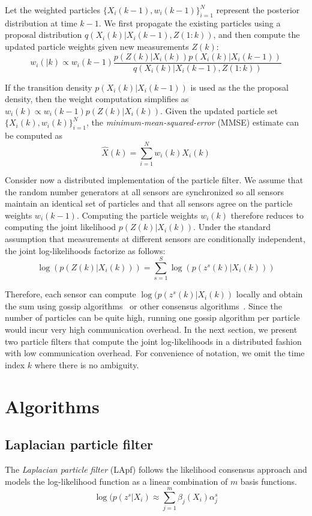 \documentclass[10pt,letterpaper,final]{article}
\begin{document}
Let the weighted particles $\{X_i(k-1),w_i(k-1) \}_{i=1}^N$ represent the posterior distribution at time $k-1$. We first propagate the existing particles using a proposal distribution $q(X_i(k)|X_i(k-1), Z(1:k))$, and then compute the updated particle weights given new measurements $Z(k)$:
\begin{equation}
w_i(|k) \propto w_i(k-1)\frac{p(Z(k)|X_i(k))p(X_i(k)|X_i(k-1))}{q(X_i(k)|X_i(k-1), Z(1:k))}
\end{equation}

If the transition density $p(X_i(k)|X_i(k-1))$ is used as the the proposal density, then the weight computation simplifies as $w_i(k) \propto w_i(k-1)p(Z(k)|X_i(k))$. Given the updated particle set $\{ X_i(k), w_i(k)\}_{i=1}^N$, the \textit{minimum-mean-squared-error} (MMSE) estimate can be computed as
\begin{equation}
\hat{X}(k) = \sum_{i=1}^N w_i(k)X_i(k)
\end{equation}

Consider now a distributed implementation of the particle filter. We assume that the random number generators at all sensors are synchronized so all sensors maintain an identical set of particles and that all sensors agree on the particle weights $w_i(k-1)$. Computing the particle weights $w_i(k)$ therefore reduces to computing the joint likelihood $p(Z(k)|X_i(k))$. Under the standard assumption that measurements at different sensors are conditionally independent, the joint log-likelihoods factorize as follows:
\begin{equation}
\log(p(Z(k)|X_i(k))) = \sum_{s=1}^S \log(p(z^s(k)|X_i(k)))
\end{equation}

Therefore, each sensor can compute $\log(p(z^s(k)|X_i(k))$ locally and obtain the sum using gossip algorithms~\cite{Boyd2006, Ustebay2011Gossip} or other consensus algorithms~\cite{Xiao2005}. Since the number of particles can be quite high, running one gossip algorithm per particle would incur very high communication overhead. In the next section, we present two particle filters that compute the joint log-likelihoods in a distributed fashion with low communication overhead. For convenience of notation, we omit the time index $k$ where there is no ambiguity. 

\section{Algorithms}
\subsection{Laplacian particle filter}
The \textit{Laplacian particle filter} (LApf) follows the likelihood consensus approach and models the log-likelihood function as a linear combination of $m$ basis functions. 
\begin{equation}
\log (p(z^s|X_i) \approx \sum_{j=1}^m \beta_j(X_i)\alpha_j^s
\end{equation}
\end{document}
